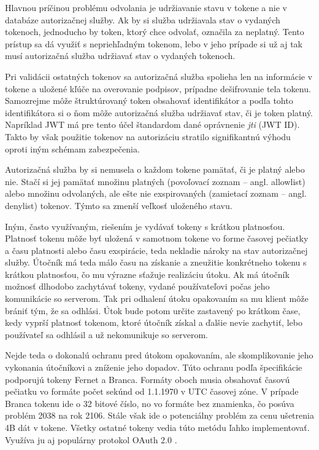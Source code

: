 Hlavnou príčinou problému odvolania je udržiavanie stavu v tokene a nie v databáze autorizačnej služby. Ak by si služba udržiavala stav o vydaných tokenoch, jednoducho by token, ktorý chce odvolať, označila za neplatný. Tento prístup sa dá využiť s nepriehľadným tokenom, lebo v jeho prípade si už aj tak musí autorizačná služba udržiavať stav o vydaných tokenoch.

Pri validácii ostatných tokenov sa autorizačná služba spolieha len na informácie v tokene a uložené kľúče na overovanie podpisov, prípadne dešifrovanie tela tokenu. Samozrejme môže štruktúrovaný token obsahovať identifikátor a podľa tohto identifikátora si o ňom môže autorizačná služba udržiavať stav, či je token platný. Napríklad JWT má pre tento účel štandardom dané oprávnenie \textit{jti} (JWT ID). Takto by však použitie tokenov na autorizáciu stratilo signifikantnú výhodu oproti iným schémam zabezpečenia.

Autorizačná služba by si nemusela o každom tokene pamätať, či je platný alebo nie. Stačí si jej pamätať množinu platných (povoľovací zoznam -- angl. allowlist) alebo množinu odvolaných, ale ešte nie exspirovaných (zamietací zoznam -- angl. denylist) tokenov. Týmto sa zmenší veľkosť uloženého stavu.

Iným, často využívaným, riešením je vydávať tokeny s krátkou platnosťou. Platnosť tokenu môže byť uložená v samotnom tokene vo forme časovej pečiatky a času platnosti alebo času exspirácie, teda nekladie nároky na stav autorizačnej služby. Útočník má teda málo času na získanie a zneužitie konkrétneho tokenu s krátkou platnosťou, čo mu výrazne sťažuje realizáciu útoku. Ak má útočník možnosť dlhodobo zachytávať tokeny, vydané používateľovi počas jeho komunikácie so serverom. Tak pri odhalení útoku opakovaním sa mu klient môže brániť tým, že sa odhlási. Útok bude potom určite zastavený po krátkom čase, kedy vyprší platnosť tokenom, ktoré útočník získal a ďalšie nevie zachytiť, lebo používateľ sa odhlásil a už nekomunikuje so serverom.

Nejde teda o dokonalú ochranu pred útokom opakovaním, ale skomplikovanie jeho vykonania útočníkovi a zníženie jeho dopadov. Túto ochranu podľa špecifikácie podporujú tokeny Fernet a Branca. Formáty oboch musia obsahovať časovú pečiatku vo formáte počet sekúnd od 1.1.1970 v UTC časovej zóne. V prípade Branca tokenu ide o 32 bitové číslo, no vo formáte bez znamienka, čo posúva problém 2038 \cite{epoch_end} na rok 2106. Stále však ide o potenciálny problém za cenu ušetrenia 4B dát v tokene. Všetky ostatné tokeny vedia túto metódu ľahko implementovať. Využíva ju aj populárny protokol OAuth 2.0 \cite{oauth2}.

